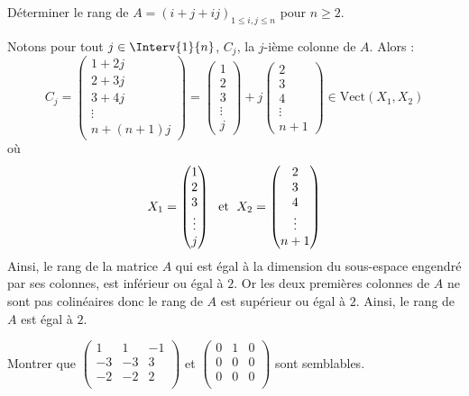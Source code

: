 \documentclass[a4paper,10pt]{report}
\begin{document}
\begin{Exercice}{} Déterminer le rang de $A=(i+j+ij)_{1\leq i,j\leq n}$ pour $n \geq 2$.
\end{Exercice} 

\corr Notons pour tout $j \in \Interv{1}{n}$, $C_j$, la $j$-ième colonne de $A$. Alors :
$$ C_j = \begin{pmatrix}
1 + 2j \\
2 + 3j \\
3 + 4j \\
\vdots \\
n + (n+1)j
\end{pmatrix} = \begin{pmatrix}
1  \\
2  \\
3  \\
\vdots \\
 j
\end{pmatrix} + j \begin{pmatrix}
2 \\
3 \\
4\\
\vdots \\
n+1
\end{pmatrix} \in \textrm{Vect}(X_1,X_2)$$
où 
$$ X_1= \begin{pmatrix}
1  \\
2  \\
3  \\
\vdots \\
 j
\end{pmatrix} \; \hbox{ et } \; X_2 = \begin{pmatrix}
2 \\
3 \\
4\\
\vdots \\
n+1
\end{pmatrix}$$
Ainsi, le rang de la matrice $A$ qui est égal à la dimension du sous-espace engendré par ses colonnes, est inférieur ou égal à $2$. Or les deux premières colonnes de $A$ ne sont pas colinéaires donc le rang de $A$ est supérieur ou égal à $2$. Ainsi, le rang de $A$ est égal à $2$.

\begin{Exercice}{} Montrer que $\begin{pmatrix}
1 & 1 & -1 \\
-3 & -3 & 3 \\
-2 & -2 & 2 \\
\end{pmatrix}$ et $\begin{pmatrix}
0 & 1 & 0 \\
0 & 0 & 0 \\
0 & 0 & 0 \\
\end{pmatrix}$ sont semblables.
\end{Exercice}
\end{document}
